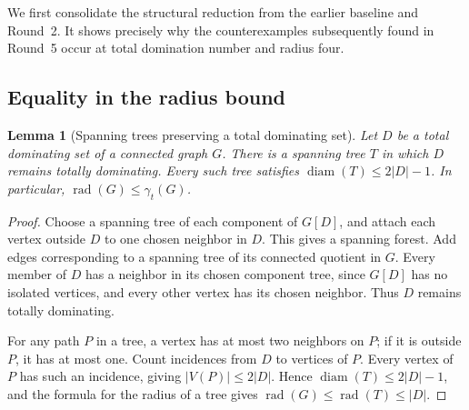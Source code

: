 \documentclass[11pt,a4paper]{article}
\newtheorem{lemma}[theorem]{Lemma}
\theoremstyle{definition}\newtheorem{definition}[theorem]{Definition}
\theoremstyle{remark}\newtheorem{remark}[theorem]{Remark}
\newcommand{\rad}{\operatorname{rad}}
\newcommand{\diam}{\operatorname{diam}}
\begin{document}
We first consolidate the structural reduction from the earlier baseline
and Round~2.  It shows precisely why the counterexamples subsequently
found in Round~5 occur at total domination number and radius four.

\subsection{Equality in the radius bound}

\begin{lemma}[Spanning trees preserving a total dominating set]
\label{early:lem:td-tree}
Let $D$ be a total dominating set of a connected graph $G$.  There is a
spanning tree $T$ in which $D$ remains totally dominating.  Every such
tree satisfies $\diam(T)\leq2|D|-1$.  In particular,
$\rad(G)\leq\gamma_t(G)$.
\end{lemma}
\begin{proof}
Choose a spanning tree of each component of $G[D]$, and attach each
vertex outside $D$ to one chosen neighbor in $D$.  This gives a
spanning forest.  Add edges corresponding to a spanning tree of its
connected quotient in $G$.  Every member of $D$ has a neighbor in its
chosen component tree, since $G[D]$ has no isolated vertices, and every
other vertex has its chosen neighbor.  Thus $D$ remains totally
dominating.

For any path $P$ in a tree, a vertex has at most two neighbors on $P$;
if it is outside $P$, it has at most one.  Count incidences from $D$
to vertices of $P$.  Every vertex of $P$ has such an incidence, giving
$|V(P)|\leq2|D|$.  Hence $\diam(T)\leq2|D|-1$, and the formula for
the radius of a tree gives $\rad(G)\leq\rad(T)\leq|D|$.
\end{proof}
\end{document}
